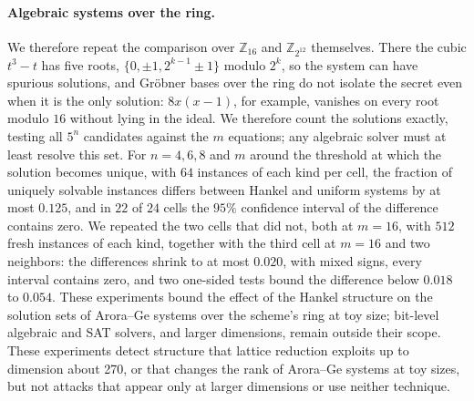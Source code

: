 \documentclass[11pt,a4paper]{article}
\theoremstyle{definition}
\newcommand{\Z}{\mathbb{Z}}
\begin{document}
\paragraph{Algebraic systems over the ring.} We therefore repeat the comparison over $\Z_{16}$ and $\Z_{2^{12}}$ themselves. There the cubic $t^3 - t$ has five roots, $\{0, \pm 1, 2^{k-1} \pm 1\}$ modulo $2^k$, so the system can have spurious solutions, and Gr\"obner bases over the ring do not isolate the secret even when it is the only solution: $8x(x-1)$, for example, vanishes on every root modulo $16$ without lying in the ideal. We therefore count the solutions exactly, testing all $5^n$ candidates against the $m$ equations; any algebraic solver must at least resolve this set. For $n = 4, 6, 8$ and $m$ around the threshold at which the solution becomes unique, with $64$ instances of each kind per cell, the fraction of uniquely solvable instances differs between Hankel and uniform systems by at most $0.125$, and in $22$ of $24$ cells the $95\%$ confidence interval of the difference contains zero. We repeated the two cells that did not, both at $m = 16$, with $512$ fresh instances of each kind, together with the third cell at $m = 16$ and two neighbors: the differences shrink to at most $0.020$, with mixed signs, every interval contains zero, and two one-sided tests bound the difference below $0.018$ to $0.054$. These experiments bound the effect of the Hankel structure on the solution sets of Arora--Ge systems over the scheme's ring at toy size; bit-level algebraic and SAT solvers, and larger dimensions, remain outside their scope. These experiments detect structure that lattice reduction exploits up to dimension about 270, or that changes the rank of Arora--Ge systems at toy sizes, but not attacks that appear only at larger dimensions or use neither technique.
\end{document}
